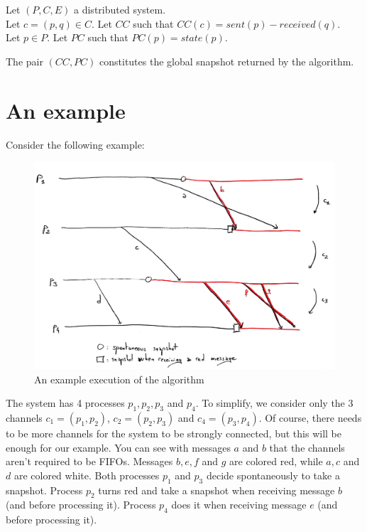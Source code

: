 \documentclass{article}
\begin{document}
Let $(P,C,E)$ a distributed system.\\
Let $c=(p,q)\in C$. Let $CC$ such that $CC(c) = \mathit{sent}(p) - \mathit{received}(q)$.\\
Let $p\in P$. Let $PC$ such that $PC(p)=\mathit{state}(p)$.

The pair $(CC,PC)$ constitutes the global snapshot returned by the algorithm.

\section{An example}

Consider the following example:
\begin{figure}[!h]
  \centering
  \includegraphics[scale=0.15]{example.jpg}
  \caption{An example execution of the algorithm}
\end{figure}

The system has 4 processes $p_1,p_2,p_3$ and $p_4$.
To simplify, we consider only the 3 channels $c_1=(p_1,p_2)$, $c_2=(p_2,p_3)$ and $c_4=(p_3,p_4)$.
Of course, there needs to be more channels for the system to be strongly connected, but this will be enough for our example.
You can see with messages $a$ and $b$ that the channels aren't required to be FIFOs.
Messages $b,e,f$ and $g$ are colored red, while $a,c$ and $d$ are colored white.
Both processes $p_1$ and $p_3$ decide spontaneously to take a snapshot.
Process $p_2$ turns red and take a snapshot when receiving message $b$ (and before processing it).
Process $p_4$ does it when receiving message $e$ (and before processing it).
\end{document}
